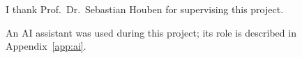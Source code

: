 \documentclass[report.tex]{subfiles}
\begin{document}
\begin{acknowledgements}
I thank Prof.~Dr.~Sebastian Houben for supervising this project.

An AI assistant was used during this project; its role is described in
Appendix~\ref{app:ai}.
\end{acknowledgements}
\end{document}
